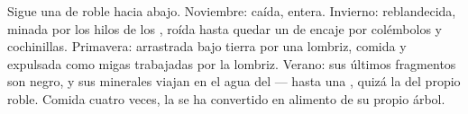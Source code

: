 \begin{example}\label{ex:g6:decomposers-and-soil:leaf}
Sigue una  de roble hacia abajo. Noviembre: caída, entera.
Invierno: reblandecida, minada por los hilos de los , roída hasta
quedar un  de encaje por colémbolos y cochinillas. Primavera:
arrastrada bajo tierra por una lombriz, comida y expulsada como migas
trabajadas por la lombriz. Verano: sus últimos fragmentos son 
negro, y sus minerales viajan en el agua del  --- hasta una ,
quizá la del propio roble. Comida cuatro veces, la  se ha
convertido en alimento de su propio árbol.
\end{example}

